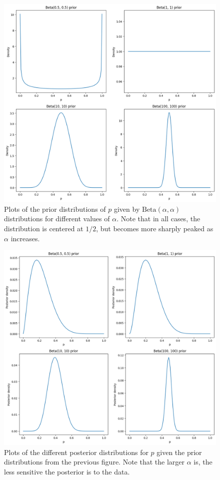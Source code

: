 \begin{ex}~
  \inputminted{python}{../code/11-05.py}
  \begin{figure}[H]
    \centering
    \includegraphics[scale=0.57]{../images/11-05a}
    \caption{
      Plots of the prior distributions of $p$ given by
      $\text{Beta}(\alpha, \alpha)$ distributions for different values of
      $\alpha$. Note that in all cases, the distribution is centered at $1/2$,
      but becomes more sharply peaked as $\alpha$ increases.
    }
  \end{figure}
  \begin{figure}[H]
    \centering
    \includegraphics[scale=0.57]{../images/11-05b}
    \caption{
      Plots of the different posterior distributions for $p$ given the prior
      distributions from the previous figure. Note that the larger $\alpha$ is,
      the less sensitive the posterior is to the data.
    }
  \end{figure}
\end{ex}

